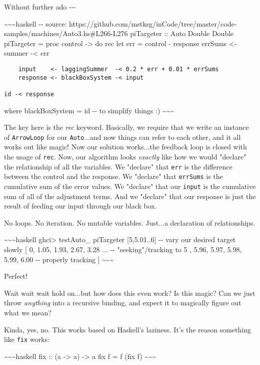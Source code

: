 \documentclass[]{article}
\begin{document}
Without further ado -\/-\/-

\textasciitilde{}\textasciitilde{}\textasciitilde{}haskell -\/- source:
https://github.com/mstksg/inCode/tree/master/code-samples/machines/Auto3.hs\#L266-L276
piTargeter :: Auto Double Double piTargeter = proc control -\textgreater{} do
rec let err = control - response errSums \textless{}- summer -\textless{} err

\begin{verbatim}
    input    <- laggingSummer  -< 0.2 * err + 0.01 * errSums
    response <- blackBoxSystem -< input

id -< response
\end{verbatim}

where blackBoxSystem = id -\/- to simplify things :)
\textasciitilde{}\textasciitilde{}\textasciitilde{}

The key here is the \emph{rec} keyword. Basically, we require that we write an
instance of \texttt{ArrowLoop} for our \texttt{Auto}...and now things can refer
to each other, and it all works out like magic! Now our solution works...the
feedback loop is closed with the usage of \texttt{rec}. Now, our algorithm looks
\emph{exactly} like how we would "declare" the relationship of all the
variables. We "declare" that \texttt{err} is the difference between the control
and the response. We "declare" that \texttt{errSums} is the cumulative sum of
the error values. We "declare" that our \texttt{input} is the cumulative sum of
all of the adjustment terms. And we "declare" that our response is just the
result of feeding our input through our black box.

No loops. No iteration. No mutable variables. Just...a declaration of
relationships.

\textasciitilde{}\textasciitilde{}\textasciitilde{}haskell ghci\textgreater{}
testAuto\_ piTargeter {[}5,5.01..6{]} -\/- vary our desired target slowly {[} 0,
1.05, 1.93, 2.67, 3.28 ... -\/- "seeking"/tracking to 5 , 5.96, 5.97, 5.98,
5.99, 6.00 -\/- properly tracking {]}
\textasciitilde{}\textasciitilde{}\textasciitilde{}

Perfect!

Wait wait wait hold on...but how does this even work? Is this magic? Can we just
throw \emph{anything} into a recursive binding, and expect it to magically
figure out what we mean?

Kinda, yes, no. This works based on Haskell's laziness. It's the reason
something like \texttt{fix} works:

\textasciitilde{}\textasciitilde{}\textasciitilde{}haskell fix :: (a
-\textgreater{} a) -\textgreater{} a fix f = f (fix f)
\textasciitilde{}\textasciitilde{}\textasciitilde{}
\end{document}

